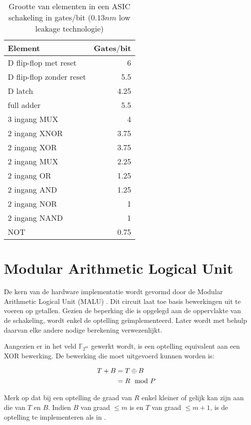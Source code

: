 \begin{table}[h]
	\caption{Grootte van elementen in een ASIC schakeling in gates$/$bit ($0.13 nm$ low leakage technologie)\cite{cell-databook}}
	\label{tabel-implementatie-beperkingen-elementen-gatecount}
	\begin{tabular}{|l|r|}
		\hline
		Element			& Gates$/$bit\\
		\hline
		D flip-flop met reset	& 6\\
		D flip-flop zonder reset	& 5.5\\
		D latch			& 4.25\\
		full adder		& 5.5\\
		3 ingang MUX	& 4\\
		2 ingang XNOR	& 3.75\\
		2 ingang XOR	& 3.75\\
		2 ingang MUX	& 2.25\\
		2 ingang OR		& 1.25\\
		2 ingang AND	& 1.25\\
		2 ingang NOR	& 1\\
		2 ingang NAND	& 1\\
		NOT				& 0.75\\
		\hline		
	\end{tabular}
\end{table}

\section{Modular Arithmetic Logical Unit}\label{sectie-implementatie-malu}

De kern van de hardware implementatie wordt gevormd door de Modular Arithmetic Logical Unit (MALU) \cite{sakiyama}\cite{batina-lowcost}. Dit circuit laat toe basis bewerkingen uit te voeren op getallen. Gezien de beperking die is opgelegd aan de oppervlakte van de schakeling, wordt enkel de optelling ge\"implementeerd. Later wordt met behulp daarvan elke andere nodige berekening verwezenlijkt.

Aangezien er in het veld $\mathbb{F}_{2^m}$ gewerkt wordt, is een optelling equivalent aan een XOR bewerking. De bewerking die moet uitgevoerd kunnen worden is:

\[\begin{aligned}
T + B	&= T \oplus B\\
		&= R \mod P
\end{aligned}\]

Merk op dat bij een optelling de graad van $R$ enkel kleiner of gelijk kan zijn aan die van $T$ en $B$. Indien $B$ van graad $\leq m$ is en $T$ van graad $\leq m + 1$, is de optelling te implementeren als in .

